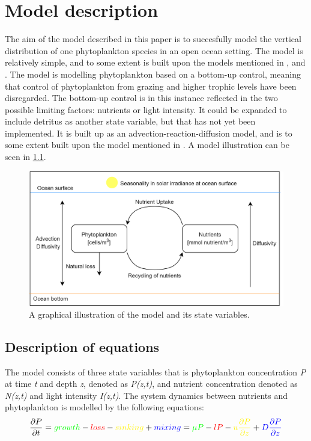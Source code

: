 \chapter{Model description}
The aim of the model described in this paper is to succesfully model the vertical distribution of one phytoplankton species in an open ocean setting. The model is relatively simple, and to some extent is built upon the models mentioned in \cite{RYABOV2010120}, \cite{HUISMAN2002} and \cite{BECKMANN2007}. The model is modelling phytoplankton based on a bottom-up control, meaning that control of phytoplankton from grazing and higher trophic levels have been disregarded. The bottom-up control is in this instance reflected in the two possible limiting factors: nutrients or light intensity. It could be expanded to include detritus as another state variable, but that has not yet been implemented. It is built up as an advection-reaction-diffusion model, and is to some extent built upon the model mentioned in \cite{RYABOV2010120}. A model illustration can be seen in \cref{fig:ModelIllustration}. 

\begin{figure}[H]
\centering
\includegraphics[width=.7\linewidth]{Pictures/ModelIllustration.png}
\caption{A graphical illustration of the model and its state variables.}
\label{fig:ModelIllustration}
\end{figure}

\section{Description of equations} \label{DescripEq}
The model consists of three state variables that is phytoplankton concentration \textit{P} at time \textit{t} and depth \textit{z}, denoted as \textit{P(z,t)}, and nutrient concentration denoted as \textit{N(z,t)} and light intensity \textit{I(z,t)}. 
The system dynamics between nutrients and phytoplankton is modelled by the following equations:
\begin{equation} \label{eq:Peq}
    \frac{\partial P}{\partial t} = \textcolor{green}{growth} - \textcolor{red}{loss} - \textcolor{yellow}{sinking} + \textcolor{blue}{mixing} = \textcolor{green}{\mu P} - \textcolor{red}{lP} - \textcolor{yellow}{u\frac{\partial P}{\partial z}} + \textcolor{blue}{D\frac{\partial P}{\partial z}}
\end{equation}

